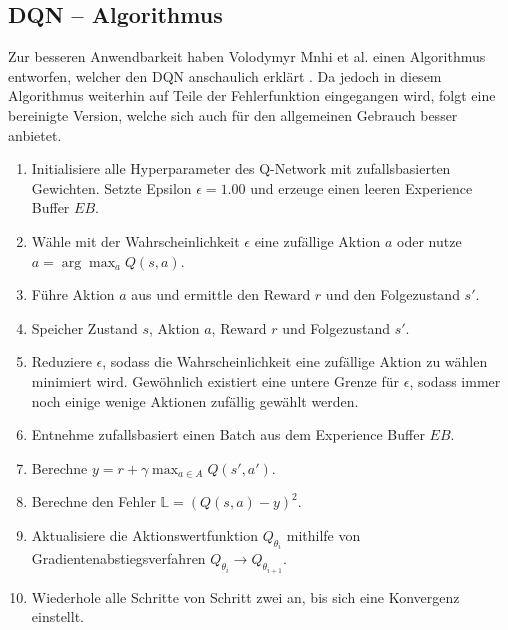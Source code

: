 \subsection{DQN -- Algorithmus} \label{subsec:Grundlagen_DQN_Algorithmus}
Zur besseren Anwendbarkeit haben Volodymyr Mnhi et al. einen Algorithmus entworfen, welcher den DQN anschaulich erklärt \citep{DBLP:journals/corr/MnihKSGAWR13}. Da jedoch in diesem Algorithmus weiterhin auf Teile der Fehlerfunktion eingegangen wird, folgt eine bereinigte Version, welche sich auch für den allgemeinen Gebrauch besser anbietet. \citep[S. 149 f.]{DRL_Lapan}
\begin{enumerate} 
	\item Initialisiere alle Hyperparameter des Q-Network mit zufallsbasierten Gewichten. Setzte Epsilon $\epsilon = 1.00$ und erzeuge einen leeren Experience Buffer $EB$.
	\item Wähle mit der Wahrscheinlichkeit $\epsilon$ eine zufällige Aktion $a$ oder nutze $a = \arg\max_{a} Q(s,a)$.
	\item Führe Aktion $a$ aus und ermittle den Reward $r$ und den Folgezustand $s'$.
	\item Speicher Zustand $s$, Aktion $a$, Reward $r$ und Folgezustand $s'$.
	\item Reduziere $\epsilon$, sodass die Wahrscheinlichkeit eine zufällige Aktion zu wählen minimiert wird. Gewöhnlich existiert eine untere Grenze für $\epsilon$, sodass immer noch einige wenige Aktionen zufällig gewählt werden.
	\item Entnehme zufallsbasiert einen Batch aus dem Experience Buffer $EB$.
	\item Berechne $y = r + \gamma \max_{a \in A}Q(s',a')$.
	\item Berechne den Fehler $\mathbb{L} = (Q(s,a) - y)^2$.
	\item Aktualisiere die Aktionswertfunktion $Q_{\theta_{i}}$ mithilfe von Gradientenabstiegsverfahren $Q_{\theta_{i}} \longrightarrow Q_{\theta_{i+1}}$.
	\item Wiederhole alle Schritte von Schritt zwei an, bis sich eine Konvergenz einstellt.
\end{enumerate}
